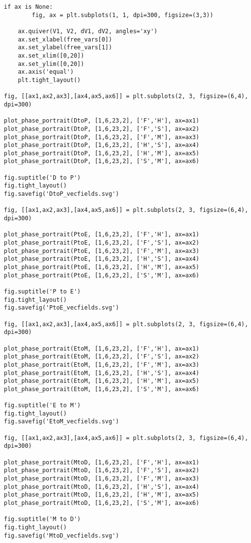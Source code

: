 \documentclass[11pt]{article}
\begin{document}
\begin{Verbatim}[frame=single]
    if ax is None:
        fig, ax = plt.subplots(1, 1, dpi=300, figsize=(3,3))

    ax.quiver(V1, V2, dV1, dV2, angles='xy')
    ax.set_xlabel(free_vars[0])
    ax.set_ylabel(free_vars[1])
    ax.set_xlim([0,20])
    ax.set_ylim([0,20])
    ax.axis('equal')
    plt.tight_layout()

fig, [[ax1,ax2,ax3],[ax4,ax5,ax6]] = plt.subplots(2, 3, figsize=(6,4), dpi=300)

plot_phase_portrait(DtoP, [1,6,23,2], ['F','H'], ax=ax1)
plot_phase_portrait(DtoP, [1,6,23,2], ['F','S'], ax=ax2)
plot_phase_portrait(DtoP, [1,6,23,2], ['F','M'], ax=ax3)
plot_phase_portrait(DtoP, [1,6,23,2], ['H','S'], ax=ax4)
plot_phase_portrait(DtoP, [1,6,23,2], ['H','M'], ax=ax5)
plot_phase_portrait(DtoP, [1,6,23,2], ['S','M'], ax=ax6)

fig.suptitle('D to P')
fig.tight_layout()
fig.savefig('DtoP_vecfields.svg')

fig, [[ax1,ax2,ax3],[ax4,ax5,ax6]] = plt.subplots(2, 3, figsize=(6,4), dpi=300)

plot_phase_portrait(PtoE, [1,6,23,2], ['F','H'], ax=ax1)
plot_phase_portrait(PtoE, [1,6,23,2], ['F','S'], ax=ax2)
plot_phase_portrait(PtoE, [1,6,23,2], ['F','M'], ax=ax3)
plot_phase_portrait(PtoE, [1,6,23,2], ['H','S'], ax=ax4)
plot_phase_portrait(PtoE, [1,6,23,2], ['H','M'], ax=ax5)
plot_phase_portrait(PtoE, [1,6,23,2], ['S','M'], ax=ax6)

fig.suptitle('P to E')
fig.tight_layout()
fig.savefig('PtoE_vecfields.svg')

fig, [[ax1,ax2,ax3],[ax4,ax5,ax6]] = plt.subplots(2, 3, figsize=(6,4), dpi=300)

plot_phase_portrait(EtoM, [1,6,23,2], ['F','H'], ax=ax1)
plot_phase_portrait(EtoM, [1,6,23,2], ['F','S'], ax=ax2)
plot_phase_portrait(EtoM, [1,6,23,2], ['F','M'], ax=ax3)
plot_phase_portrait(EtoM, [1,6,23,2], ['H','S'], ax=ax4)
plot_phase_portrait(EtoM, [1,6,23,2], ['H','M'], ax=ax5)
plot_phase_portrait(EtoM, [1,6,23,2], ['S','M'], ax=ax6)

fig.suptitle('E to M')
fig.tight_layout()
fig.savefig('EtoM_vecfields.svg')

fig, [[ax1,ax2,ax3],[ax4,ax5,ax6]] = plt.subplots(2, 3, figsize=(6,4), dpi=300)

plot_phase_portrait(MtoD, [1,6,23,2], ['F','H'], ax=ax1)
plot_phase_portrait(MtoD, [1,6,23,2], ['F','S'], ax=ax2)
plot_phase_portrait(MtoD, [1,6,23,2], ['F','M'], ax=ax3)
plot_phase_portrait(MtoD, [1,6,23,2], ['H','S'], ax=ax4)
plot_phase_portrait(MtoD, [1,6,23,2], ['H','M'], ax=ax5)
plot_phase_portrait(MtoD, [1,6,23,2], ['S','M'], ax=ax6)

fig.suptitle('M to D')
fig.tight_layout()
fig.savefig('MtoD_vecfields.svg')
\end{Verbatim}
\end{document}

